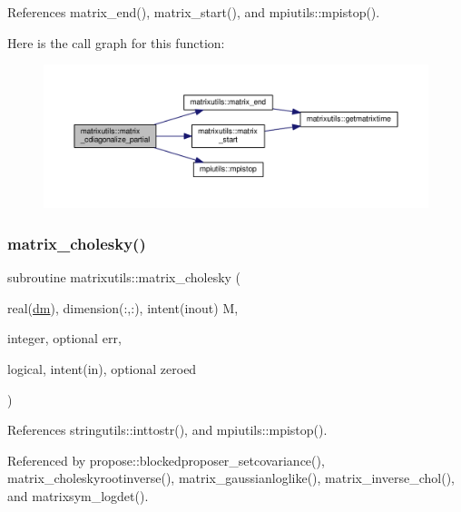 References matrix\+\_\+end(), matrix\+\_\+start(), and mpiutils\+::mpistop().

Here is the call graph for this function\+:
\nopagebreak
\begin{figure}[H]
\begin{center}
\leavevmode
\includegraphics[width=350pt]{namespacematrixutils_a30f09f7f2856414c7cfdc635a108039a_cgraph}
\end{center}
\end{figure}
\mbox{\label{namespacematrixutils_a380ecdd4310ae2f91be911a45516df12}} 
\subsubsection{\texorpdfstring{matrix\+\_\+cholesky()}{matrix\_cholesky()}}
{\footnotesize\ttfamily subroutine matrixutils\+::matrix\+\_\+cholesky (\begin{DoxyParamCaption}\item[{real(\mbox{\hyperlink{namespacematrixutils_a7bdc564986ea4d90f51201c75606ef3d}{dm}}), dimension(\+:,\+:), intent(inout)}]{M,  }\item[{integer, optional}]{err,  }\item[{logical, intent(in), optional}]{zeroed }\end{DoxyParamCaption})}



References stringutils\+::inttostr(), and mpiutils\+::mpistop().



Referenced by propose\+::blockedproposer\+\_\+setcovariance(), matrix\+\_\+choleskyrootinverse(), matrix\+\_\+gaussianloglike(), matrix\+\_\+inverse\+\_\+chol(), and matrixsym\+\_\+logdet().

